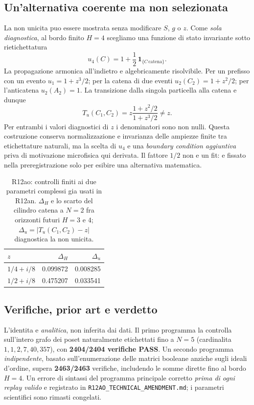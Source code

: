 \documentclass[11pt,a4paper]{article}
\begin{document}
\subsection{Un'alternativa coerente ma non selezionata}
La non unicita puo essere mostrata senza modificare $S$, $g$ o $z$. Come \emph{sola diagnostica}, al bordo finito $H=4$ scegliamo una funzione di stato invariante sotto rietichettatura
\begin{equation}
 u_4(C)=1+\frac12\,\mathbf 1_{\{C\,\mathrm{catena}\}}.
 \label{eq:r12ao_alt_terminal}
\end{equation}
La propagazione armonica all'indietro e algebricamente risolvibile. Per un prefisso con un evento $u_1=1+z^3/2$; per la catena di due eventi $u_2(C_2)=1+z^2/2$; per l'anticatena $u_2(A_2)=1$. La transizione dalla singola particella alla catena e dunque
\begin{equation}
 T_u(C_1,C_2)=z\frac{1+z^2/2}{1+z^3/2}\ne z.
 \label{eq:r12ao_alt_formula}
\end{equation}
Per entrambi i valori diagnostici di $z$ i denominatori sono non nulli. Questa costruzione conserva normalizzazione e invarianza delle ampiezze finite tra etichettature naturali, ma la scelta di $u_4$ e una \emph{boundary condition aggiuntiva} priva di motivazione microfisica qui derivata. Il fattore $1/2$ non e un fit: e fissato nella preregistrazione solo per esibire una alternativa matematica.

\begin{table}[htbp]\centering\small
\caption{R12ao: controlli finiti ai due parametri complessi gia usati in R12an. $\Delta_H$ e lo scarto del cilindro catena a $N=2$ fra orizzonti futuri $H=3$ e $4$; $\Delta_u=|T_u(C_1,C_2)-z|$ diagnostica la non unicita.}
\label{tab:r12ao_checks}
\begin{tabular}{lrr}\toprule
$z$ & $\Delta_H$ & $\Delta_u$ \\\midrule
$1/4+i/8$ & 0.099872 & 0.008285\\
$1/2+i/8$ & 0.475207 & 0.033541\\\bottomrule
\end{tabular}
\end{table}

\subsection{Verifiche, prior art e verdetto}
L'identita e \emph{analitica}, non inferita dai dati. Il primo programma la controlla sull'intero grafo dei poset naturalmente etichettati fino a $N=5$ (cardinalita $1,1,2,7,40,357$), con \textbf{2404/2404 verifiche PASS}. Un secondo programma \emph{indipendente}, basato sull'enumerazione delle matrici booleane anziche sugli ideali d'ordine, supera \textbf{2463/2463} verifiche, includendo le somme dirette fino al bordo $H=4$. Un errore di sintassi del programma principale corretto \emph{prima di ogni replay valido} e registrato in \texttt{R12AO\_TECHNICAL\_AMENDMENT.md}; i parametri scientifici sono rimasti congelati.
\end{document}
